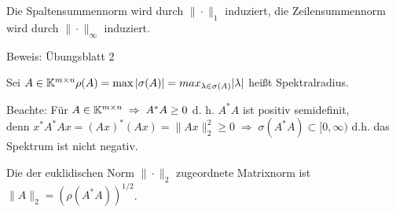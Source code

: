 \begin{Satz}
  Die Spaltensummennorm wird durch $\| \cdot \|_1$ induziert, die Zeilensummennorm
  wird durch $\| \cdot \|_\infty$ induziert.
\end{Satz}
Beweis: Übungsblatt 2

\begin{Definition}[Spektralradius]
Sei $A \in \mathbb K^{m \times n} \; \\
 \rho (A) = \max |\sigma(A)| =  max_{\lambda \in \sigma(A)} |\lambda|$
 heißt Spektralradius.
\end{Definition}

Beachte: Für  $A \in \mathbb K^{m \times n} \; \Rightarrow \; A^* A \ge 0 $ d. h.
$A^* A$ ist positiv semidefinit,\\
denn $x^* A^* A x = (A x)^* (A x) = \|A x\|_2^2 \ge 0  \; \Rightarrow \;
\sigma(A^* A) \subset [0, \infty)$ d.h. das Spektrum ist nicht negativ.

\begin{Satz}
  Die der euklidischen Norm $\| \cdot \|_2$ zugeordnete Matrixnorm ist
  $\|A\|_2 = (\rho(A^* A))^{1/2}$.
\end{Satz}



